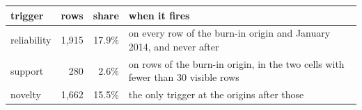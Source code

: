 \begin{tabular}{lrrp{}}
\toprule
trigger & rows & share & when it fires \\
\midrule
reliability & 1,915 & 17.9\% & on every row of the burn-in origin and January 2014, and never after \\
support & 280 & 2.6\% & on rows of the burn-in origin, in the two cells with fewer than 30 visible rows \\
novelty & 1,662 & 15.5\% & the only trigger at the origins after those \\

\end{tabular}
